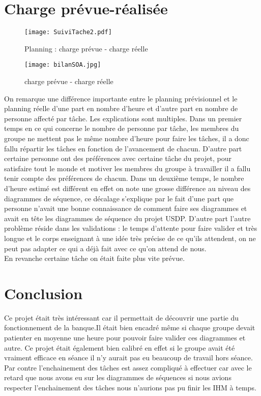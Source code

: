 \section {Charge prévue-réalisée}

\begin{figure}[H]
	\begin{center}
		\texttt{[image: SuiviTache2.pdf]}
		\caption{Planning : charge prévue - charge réelle}
	\end{center}
\end{figure}

\begin{figure}[H]
	\begin{center}
		\texttt{[image: bilanSOA.jpg]}
		\caption{charge prévue - charge réelle}
	\end{center}
\end{figure}

On remarque une différence importante entre le planning prévisionnel et le planning réelle d'une part en nombre d'heure et d'autre part en nombre de personne affecté par tâche. Les explications sont multiples. Dans un premier temps en ce qui concerne le nombre de personne par tâche, les membres du groupe ne mettent pas le même nombre d'heure pour faire les tâches, il a donc fallu répartir les tâches en fonction de l'avancement de chacun. D'autre part certaine personne ont des préférences avec certaine tâche du projet, pour satisfaire tout le monde et motiver les membres du groupe à travailler il a fallu tenir compte des préférences de chacun. Dans un deuxième temps, le nombre d'heure estimé est différent en effet on note une grosse différence au niveau des diagrammes de séquence, ce décalage s'explique par le fait d'une part que personne n'avait une bonne connaissance de comment faire ses diagrammes et avait en tête les diagrammes de séquence du projet USDP. D'autre part l'autre problème réside dans les validations : le temps d'attente pour faire valider et très longue et le corps enseignant à une idée très précise de ce qu'ils attendent, on ne peut pas adapter ce qui a déjà fait avec ce qu'on attend de nous. \\
En revanche certaine tâche on était faite plus vite prévue.

\section{Conclusion}
Ce projet était très intéressant car il permettait de découvrir une partie du fonctionnement de la banque.Il était bien encadré m\^eme si chaque groupe devait patienter en moyenne une heure pour pouvoir faire valider ces diagrammes et autre. Ce projet était également bien calibré en effet si le groupe avait été vraiment efficace en séance il n'y aurait pas eu beaucoup de travail hors séance. Par contre l'enchainement des t\^aches est assez compliqué à effectuer car avec le retard que nous avons eu sur les diagrammes de séquences si nous avions respecter l'enchainement des t\^aches nous n'aurions pas pu finir les IHM à temps.  